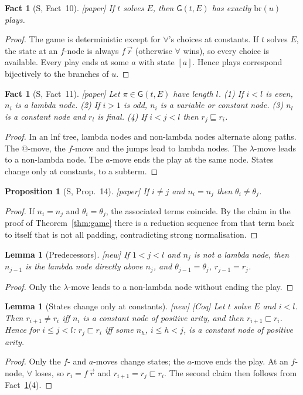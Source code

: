 \documentclass[11pt]{article}
\newcommand{\br}{\mathrm{br}}
\newcommand{\Gm}{\mathsf{G}}
\newcommand{\sq}{\sqsubseteq}
\newcommand{\ssq}{\sqsubset}
\newcommand{\Paper}{\textsf{[paper]}}
\newcommand{\New}{\textsf{[new]}}
\newcommand{\Coq}{\textsf{[Coq]}}
\theoremstyle{plain}
\newtheorem{proposition}[theorem]{Proposition}
\newtheorem{lemma}[theorem]{Lemma}
\newtheorem{fact}[theorem]{Fact}
\theoremstyle{definition}
\theoremstyle{remark}
\begin{document}
\begin{fact}[S, Fact~10]\label{fact:branches}
\Paper{} If $t$ solves $E$, then $\Gm(t,E)$ has exactly $\br(u)$ plays.
\end{fact}
\begin{proof}
The game is deterministic except for $\forall$'s choices at constants.
If $t$ solves $E$, the state at an $f$-node is always $f\,\vec r$
(otherwise $\forall$ wins), so every choice is available.  Every play
ends at some $a$ with state $[a]$.  Hence plays correspond bijectively
to the branches of $u$.
\end{proof}

\begin{fact}[S, Fact~11]\label{fact:parity}
\Paper{} Let $\pi\in\Gm(t,E)$ have length $l$.
(1) If $i<l$ is even, $n_i$ is a lambda node.
(2) If $i>1$ is odd, $n_i$ is a variable or constant node.
(3) $n_l$ is a constant node and $r_l$ is final.
(4) If $i<j<l$ then $r_j\sq r_i$.
\end{fact}
\begin{proof}
In an lnf tree, lambda nodes and non-lambda nodes alternate along paths.
The $@$-move, the $f$-move and the jumps lead to lambda nodes.  The
$\lambda$-move leads to a non-lambda node.  The $a$-move ends the play
at the same node.  States change only at constants, to a subterm.
\end{proof}

\begin{proposition}[S, Prop.~14]\label{prop:distinct}
\Paper{} If $i\ne j$ and $n_i=n_j$ then $\theta_i\ne\theta_j$.
\end{proposition}
\begin{proof}
If $n_i=n_j$ and $\theta_i=\theta_j$, the associated terms coincide.
By the claim in the proof of Theorem~\ref{thm:game} there is a reduction
sequence from that term back to itself that is not all padding,
contradicting strong normalisation.
\end{proof}

\begin{lemma}[Predecessors]\label{lem:pred}
\New{} If $1<j<l$ and $n_j$ is not a lambda node, then $n_{j-1}$
is the lambda node directly above $n_j$, and $\theta_{j-1}=\theta_j$,
$r_{j-1}=r_j$.
\end{lemma}
\begin{proof}
Only the $\lambda$-move leads to a non-lambda node without ending the
play.
\end{proof}

\begin{lemma}[States change only at constants]\label{lem:states}
\New{} \Coq{} Let $t$ solve $E$ and $i<l$.  Then $r_{i+1}\ne r_i$ iff
$n_i$ is a constant node of positive arity, and then $r_{i+1}\ssq r_i$.
Hence for $i\le j<l$: $r_j\ssq r_i$ iff some $n_h$, $i\le h<j$, is a
constant node of positive arity.
\end{lemma}
\begin{proof}
Only the $f$- and $a$-moves change states; the $a$-move ends the play.
At an $f$-node, $\forall$ loses, so $r_i=f\,\vec r$ and $r_{i+1}=r_j\ssq
r_i$.  The second claim then follows from Fact~\ref{fact:parity}(4).
\end{proof}
\end{document}
